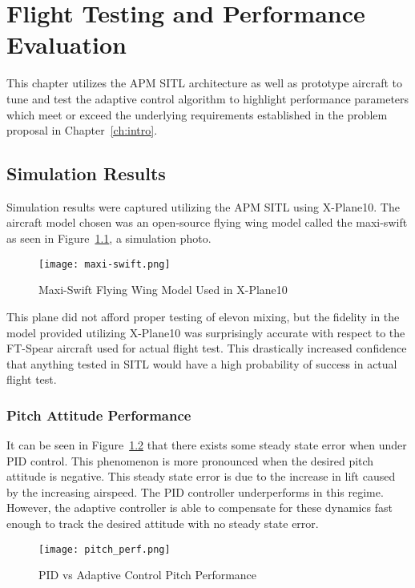 \chapter{Flight Testing and Performance Evaluation}\label{ch:performance}
This chapter utilizes the \ac{APM} \ac{SITL} architecture as well as prototype aircraft to tune and test the \Lone adaptive control algorithm to highlight performance parameters which meet or exceed the underlying requirements established in the problem proposal in Chapter~\ref{ch:intro}.

\section{Simulation Results}
Simulation results were captured utilizing the \ac{APM} \ac{SITL} using X-Plane10.  The aircraft model chosen was an open-source flying wing model called the maxi-swift as seen in Figure~\ref{fig:maxi-swift}, a simulation photo.

\begin{figure}[!h]
 \centering
  \texttt{[image: maxi-swift.png]}
  \caption{Maxi-Swift Flying Wing Model Used in X-Plane10}
  \label{fig:maxi-swift}
\end{figure}
This plane did not afford proper testing of elevon mixing, but the fidelity in the model provided utilizing X-Plane10 was surprisingly accurate with respect to the FT-Spear aircraft used for actual flight test.  This drastically increased confidence that anything tested in \ac{SITL} would have a high probability of success in actual flight test.


\subsection{Pitch Attitude Performance}

It can be seen in Figure~\ref{fig:pitch_perf} that there exists some steady state error when under \ac{PID} control.  This phenomenon is more pronounced when the desired pitch attitude is negative.  This steady state error is due to the increase in lift caused by the increasing airspeed.  The \ac{PID} controller underperforms in this regime.  However, the adaptive controller is able to compensate for these dynamics fast enough to track the desired attitude with no steady state error.

\begin{figure}[h!]
 \centering
  \texttt{[image: pitch\_perf.png]}
  \caption{PID vs \Lone Adaptive Control Pitch Performance}
  \label{fig:pitch_perf}
\end{figure}

